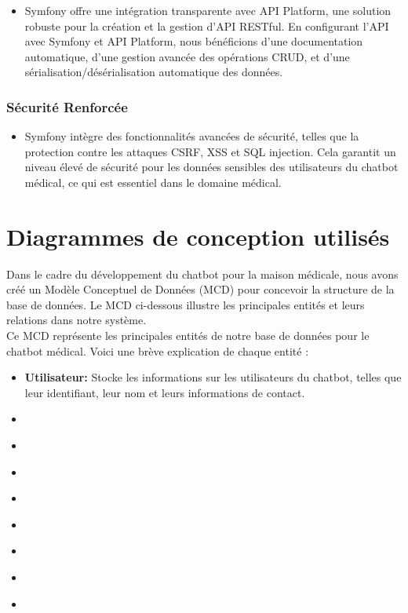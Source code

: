 \begin{itemize}
  \item Symfony offre une intégration transparente avec API Platform, une solution robuste pour la création et la gestion d'API RESTful. En configurant l'API avec Symfony et API Platform, nous bénéficions d'une documentation automatique, d'une gestion avancée des opérations CRUD, et d'une sérialisation/désérialisation automatique des données.
\end{itemize}

\subsubsection{Sécurité Renforcée}

\begin{itemize}
  \item Symfony intègre des fonctionnalités avancées de sécurité, telles que la protection contre les attaques CSRF, XSS et SQL injection. Cela garantit un niveau élevé de sécurité pour les données sensibles des utilisateurs du chatbot médical, ce qui est essentiel dans le domaine médical.
\end{itemize}


\section{Diagrammes de conception utilisés}

\hspace{16pt}Dans le cadre du développement du chatbot pour la maison médicale, nous avons créé un Modèle Conceptuel de Données (MCD) pour concevoir la structure de la base de données. Le MCD ci-dessous illustre les principales entités et leurs relations dans notre système.\\

Ce MCD représente les principales entités de notre base de données pour le chatbot médical. Voici une brève explication de chaque entité :


\begin{itemize}
  \item \textbf{Utilisateur: }Stocke les informations sur les utilisateurs du chatbot, telles que leur identifiant, leur nom et leurs informations de contact.
  \item \textbf{ }
  \item \textbf{ }
  \item \textbf{ }
  \item \textbf{ }
  \item \textbf{ }
  \item \textbf{ }
  \item \textbf{ }
  \item \textbf{ }
\end{itemize}



